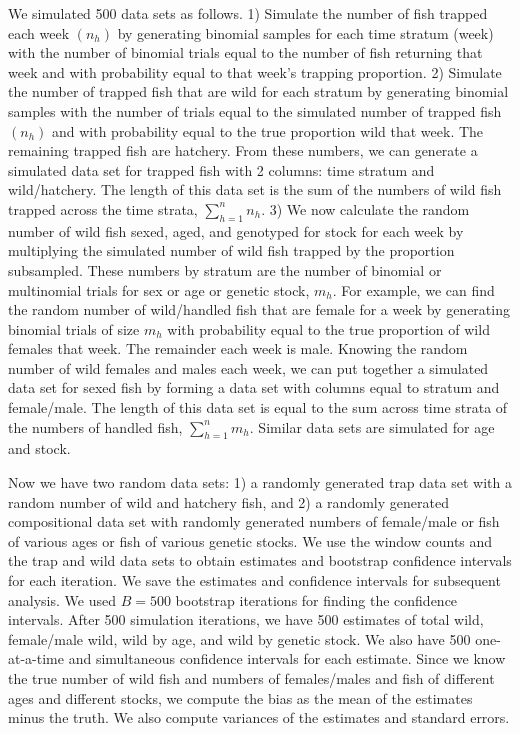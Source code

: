 \documentclass[%
                leqno,         %
%
]{nrc1}                          %
\begin{document}
We simulated 500 data sets as follows. 1) Simulate the number of fish trapped each week $(n_h)$ by generating binomial samples for each time stratum (week) with the number of binomial trials equal to the number of fish returning that week and with probability equal to that week's trapping proportion. 2) Simulate the number of trapped fish that are wild for each stratum by generating binomial samples with the number of trials equal to the simulated number of trapped fish $(n_h)$ and with probability equal to the true proportion wild that week. The remaining trapped fish are hatchery. From these numbers, we can generate a simulated data set for trapped fish with 2 columns: time stratum and wild/hatchery. The length of this data set is the sum of the numbers of wild fish trapped across the time strata, \(\sum\limits_{h=1}^{n} n_h\). 3) We now calculate the random number of wild fish sexed, aged, and genotyped for stock for each week by multiplying the simulated number of wild fish trapped by the proportion subsampled. These numbers by stratum are the number of binomial or multinomial trials for sex or age or genetic stock, \(m_h\). For example, we can find the random number of wild/handled fish that are female for a week by generating binomial trials of size \(m_h\) with probability equal to the true proportion of wild females that week. The remainder each week is male. Knowing the random number of wild females and males each week, we can put together a simulated data set for sexed fish by forming a data set with columns equal to stratum and female/male. The length of this data set is equal to the sum across time strata of the numbers of handled fish,  \(\sum\limits_{h=1}^{n} m_h\). Similar data sets are simulated for age and stock.

Now we have two random data sets: 1) a randomly generated trap data set with a random number of wild and hatchery fish, and 2) a randomly generated compositional data set with randomly generated numbers of female/male or fish of various ages or fish of various genetic stocks. We use the window counts and the trap and wild data sets to obtain estimates and bootstrap confidence intervals for each iteration. We save the estimates and confidence intervals for subsequent analysis. We used $B = 500$ bootstrap iterations for finding the confidence intervals. After 500 simulation iterations, we have 500 estimates of total wild, female/male wild, wild by age, and wild by genetic stock. We also have 500 one-at-a-time and simultaneous confidence intervals for each estimate. Since we know the true number of wild fish and numbers of females/males and fish of different ages and different stocks, we compute the bias as the mean of the estimates minus the truth. We also compute variances of the estimates and standard errors.
\end{document}
